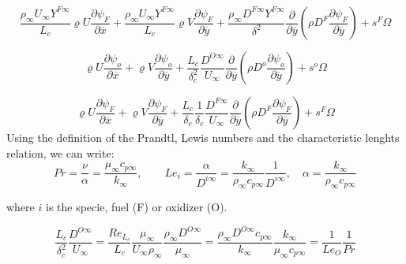 \begin{equation} 
\frac{\rho_{\infty}U_{\infty}Y^{F\infty}}{L_c}\varrho U\frac{\partial \psi_{F}}{\partial\overline{x}}+
\frac{\rho_{\infty}U_{\infty}Y^{F\infty}}{L_c}\varrho V\frac{\partial \psi_{F}}{\partial\overline{y}}+
\frac{\rho_{\infty}D^{F\infty}Y^{F\infty}}{\delta^2}\frac{\partial}{\partial \overline{y}}\left(\rho D^F\frac{\partial \psi_F}{\partial \overline{y}}\right)+
s^{F}\Omega
\end{equation} 

\begin{equation} 
\varrho U\frac{\partial \psi_{o}}{\partial\overline{x}}+
\varrho V\frac{\partial \psi_{o}}{\partial\overline{y}}+
\frac{L_c}{\delta^2_c}
\frac{D^{O\infty}}{U_\infty}\frac{\partial}{\partial \overline{y}}
\left(\rho D^o\frac{\partial \psi_o}{\partial \overline{y}}\right)+
s^{o}\Omega
\end{equation} 

\begin{equation} 
\varrho U\frac{\partial \psi_{F}}{\partial\overline{x}}+
\varrho V\frac{\partial \psi_{F}}{\partial\overline{y}}+
\frac{L_c}{\delta_c}
\frac{1}{\delta_c}
\frac{D^{F\infty}}{U_\infty}\frac{\partial}{\partial \overline{y}}\left(\rho D^F\frac{\partial \psi_F}{\partial \overline{y}}\right)+
s^{F}\Omega
\end{equation} 
%
Using the definition of the Prandtl, Lewis numbers  and 
the characteristic lenghts relation, we can write:
%
\begin{equation} 
Pr=\frac{\nu}{\alpha}=\frac{\mu_{\infty}c_{p\infty}}{k_{\infty}}
,
\qquad
Le_i=\frac{\alpha}{D^{i\infty}}=\frac{k_{\infty}}{\rho_{\infty}c_{p\infty}}
\frac{1}{D^{i\infty}}
,
\quad
\alpha=\frac{k_{\infty}}{\rho_{\infty}c_{p\infty}}
\end{equation} 

where $i$ is the specie, fuel (F) or oxidizer (O).

\begin{equation} 
\frac{L_c}{\delta_c^2}
\frac{D^{O\infty}}{U_\infty}
=
\frac{Re_{L_c}}{L_c}
\frac{\mu_{\infty}}{U_\infty\rho_{\infty}}
\frac{\rho_{\infty}D^{O\infty}}{\mu_{\infty}}
=
\frac{\rho_{\infty}D^{O\infty}c_{p\infty}}{k_{\infty}}
\frac{k_{\infty}}{\mu_{\infty}c_{p\infty}}
=
\frac{1}{Le_O}
\frac{1}{Pr}
\end{equation} 

